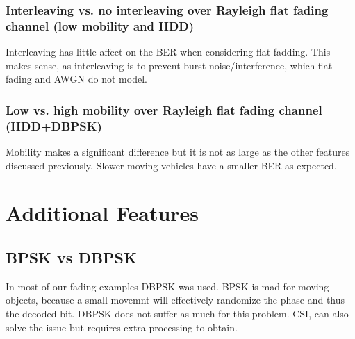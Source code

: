 \documentclass[a4paper,10pt]{article}
\begin{document}
\subsubsection{Interleaving vs. no interleaving over Rayleigh flat fading channel (low mobility and HDD)}
Interleaving has little affect on the BER when considering flat fadding. This makes sense, as interleaving is to prevent burst noise/interference, which flat fading and AWGN do not model.

\subsubsection{Low vs. high mobility over Rayleigh flat fading channel (HDD+DBPSK)}
Mobility makes a significant difference but it is not as large as the other features discussed previously. Slower moving vehicles have a smaller BER as expected.

\section{Additional Features}
\subsection{BPSK vs DBPSK}
In most of our fading examples DBPSK was used. BPSK is mad for moving objects, because a small movemnt will effectively randomize the phase and thus the decoded bit. DBPSK does not suffer as much for this problem. CSI, can also solve the issue but requires extra processing to obtain.
\end{document}
